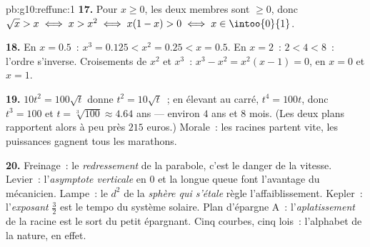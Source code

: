 \begin{solution}{pb:g10:reffunc:1}
\textbf{17.} Pour $x \geq 0$, les deux membres sont $\geq 0$, donc
$\sqrt x > x \iff x > x^2 \iff x(1 - x) > 0 \iff
x \in \intoo{0}{1}$.

\textbf{18.} En $x = 0.5$~: $x^3 = 0.125 < x^2 = 0.25 < x = 0.5$. En
$x = 2$~: $2 < 4 < 8$~: l'ordre s'inverse. Croisements de $x^2$ et
$x^3$~: $x^3 - x^2 = x^2(x - 1) = 0$, en $x = 0$ et $x = 1$.

\textbf{19.} $10t^2 = 100\sqrt t$ donne $t^2 = 10\sqrt t$~; en
élevant au carré, $t^4 = 100t$, donc $t^3 = 100$ et
$t = \sqrt[3]{100} \approx 4.64$ ans --- environ $4$ ans et $8$ mois.
(Les deux plans rapportent alors à peu près $215$ euros.) Morale~:
les racines partent vite, les puissances gagnent tous les marathons.

\textbf{20.} Freinage~: le \emph{redressement} de la parabole, c'est
le danger de la vitesse. Levier~: l'\emph{asymptote verticale} en $0$
et la longue queue font l'avantage du mécanicien. Lampe~: le $d^2$ de
la \emph{sphère qui s'étale} règle l'affaiblissement. Kepler~:
l'\emph{exposant} $\frac32$ est le tempo du système solaire. Plan
d'épargne A~: l'\emph{aplatissement} de la racine est le sort du
petit épargnant. Cinq courbes, cinq lois~: l'alphabet de la nature,
en effet.
\end{solution}
